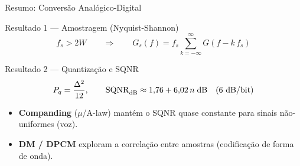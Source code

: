 \begin{frame}{Resumo: Conversão Analógico-Digital}
  \begin{block}{Resultado 1 — Amostragem (Nyquist-Shannon)}
    \[
      f_s > 2W
      \qquad\Longrightarrow\qquad
      G_s(f) = f_s\sum_{k=-\infty}^{\infty} G(f - k\,f_s)
    \]
  \end{block}

  \vspace{0.15cm}

  \begin{block}{Resultado 2 — Quantização e SQNR}
    \[
      P_q = \frac{\Delta^2}{12},
      \qquad
      \mathrm{SQNR}_{\mathrm{dB}} \approx 1{,}76 + 6{,}02\,n \;\text{dB}
      \quad (6\text{ dB/bit})
    \]
  \end{block}

  \vspace{0.15cm}
  \begin{itemize}\footnotesize
    \item \textbf{Companding} ($\mu$/A-law) mantém o SQNR quase constante
          para sinais não-uniformes (voz).
    \item \textbf{DM / DPCM} exploram a correlação entre amostras
          (codificação de forma de onda).
  \end{itemize}
\end{frame}
